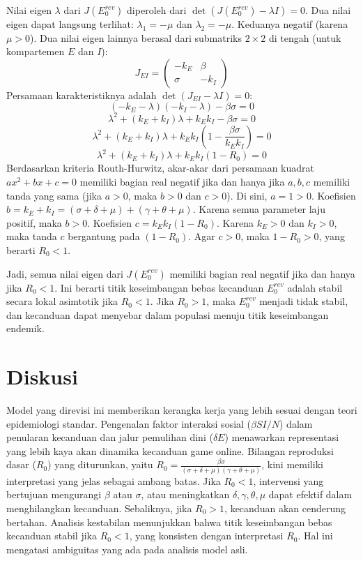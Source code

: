 \documentclass[12pt,a4paper]{article}
\begin{document}
Nilai eigen $\lambda$ dari $J(E_0^{rev})$ diperoleh dari $\det(J(E_0^{rev}) - \lambda I) = 0$.
Dua nilai eigen dapat langsung terlihat: $\lambda_1 = -\mu$ dan $\lambda_2 = -\mu$. Keduanya negatif (karena $\mu > 0$).
Dua nilai eigen lainnya berasal dari submatriks $2 \times 2$ di tengah (untuk kompartemen $E$ dan $I$):
$$ J_{EI} = \begin{pmatrix} -k_E & \beta \\ \sigma & -k_I \end{pmatrix} $$
Persamaan karakteristiknya adalah $\det(J_{EI} - \lambda I) = 0$:
$$ (-k_E - \lambda)(-k_I - \lambda) - \beta\sigma = 0 $$
$$ \lambda^2 + (k_E + k_I)\lambda + k_E k_I - \beta\sigma = 0 $$
$$ \lambda^2 + (k_E + k_I)\lambda + k_E k_I \left(1 - \frac{\beta\sigma}{k_E k_I}\right) = 0 $$
$$ \lambda^2 + (k_E + k_I)\lambda + k_E k_I (1 - R_0) = 0 $$
Berdasarkan kriteria Routh-Hurwitz, akar-akar dari persamaan kuadrat $ax^2+bx+c=0$ memiliki bagian real negatif jika dan hanya jika $a, b, c$ memiliki tanda yang sama (jika $a>0$, maka $b>0$ dan $c>0$).
Di sini, $a=1 > 0$.
Koefisien $b = k_E + k_I = (\sigma+\delta+\mu) + (\gamma+\theta+\mu)$. Karena semua parameter laju positif, maka $b > 0$.
Koefisien $c = k_E k_I (1 - R_0)$. Karena $k_E > 0$ dan $k_I > 0$, maka tanda $c$ bergantung pada $(1 - R_0)$.
Agar $c > 0$, maka $1 - R_0 > 0$, yang berarti $R_0 < 1$.

Jadi, semua nilai eigen dari $J(E_0^{rev})$ memiliki bagian real negatif jika dan hanya jika $R_0 < 1$. Ini berarti titik keseimbangan bebas kecanduan $E_0^{rev}$ adalah stabil secara lokal asimtotik jika $R_0 < 1$. Jika $R_0 > 1$, maka $E_0^{rev}$ menjadi tidak stabil, dan kecanduan dapat menyebar dalam populasi menuju titik keseimbangan endemik.

\section{Diskusi}
Model yang direvisi ini memberikan kerangka kerja yang lebih sesuai dengan teori epidemiologi standar. Pengenalan faktor interaksi sosial ($\beta SI/N$) dalam penularan kecanduan dan jalur pemulihan dini ($\delta E$) menawarkan representasi yang lebih kaya akan dinamika kecanduan game online.
Bilangan reproduksi dasar ($R_0$) yang diturunkan, yaitu $R_0 = \frac{\beta \sigma}{(\sigma + \delta + \mu)(\gamma + \theta + \mu)}$, kini memiliki interpretasi yang jelas sebagai ambang batas. Jika $R_0 < 1$, intervensi yang bertujuan mengurangi $\beta$ atau $\sigma$, atau meningkatkan $\delta, \gamma, \theta, \mu$ dapat efektif dalam menghilangkan kecanduan. Sebaliknya, jika $R_0 > 1$, kecanduan akan cenderung bertahan.
Analisis kestabilan menunjukkan bahwa titik keseimbangan bebas kecanduan stabil jika $R_0 < 1$, yang konsisten dengan interpretasi $R_0$. Hal ini mengatasi ambiguitas yang ada pada analisis model asli.
\end{document}
